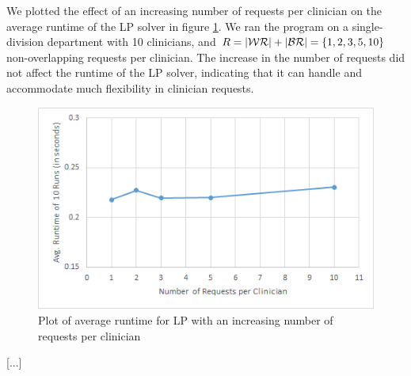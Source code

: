 We plotted the effect of an increasing number of requests per clinician on the average runtime of the LP solver in figure \ref{fig:avg-runtime-requests}. We ran the program on a single-division department with 10 clinicians, and $R = \abs{\mathcal{WR}} + \abs{\mathcal{BR}} = \{1, 2, 3, 5, 10\}$ non-overlapping requests per clinician. The increase in the number of requests did not affect the runtime of the LP solver, indicating that it can handle and accommodate much flexibility in clinician requests. \\

\begin{figure}[h]
	\centering
	\includegraphics[scale=.6]{fig/avg_runtime_requests}
	\caption{Plot of average runtime for LP with an increasing number of requests per clinician}
	\label{fig:avg-runtime-requests}
\end{figure}

[...]
